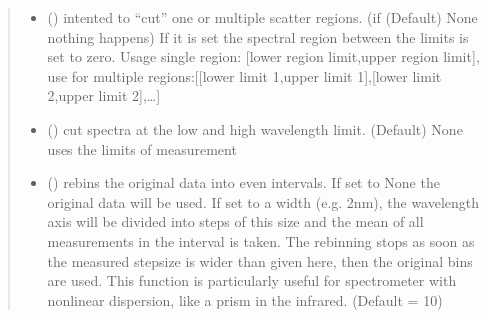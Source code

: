 \documentclass[letterpaper,10pt,english]{sphinxmanual}
\begin{document}
\begin{fulllineitems}
\begin{quote}
\begin{description}
\begin{itemize}
\item {} 
 (\sphinxstyleliteralemphasis{\sphinxupquote{ (}}\sphinxstyleliteralemphasis{\sphinxupquote{, }}\sphinxstyleliteralemphasis{\sphinxupquote{)}}\sphinxstyleliteralemphasis{\sphinxupquote{, }}) \textendash{} intented to “cut” one or multiple scatter regions. (if (Default) None nothing
happens) If it is set the spectral region between the limits is set to zero.
Usage single region: {[}lower region limit,upper region limit{]},
use for multiple regions:{[}{[}lower limit 1,upper limit 1{]},{[}lower limit 2,upper limit 2{]},…{]}

\item {} 
 (\sphinxstyleliteralemphasis{\sphinxupquote{ (}}\sphinxstyleliteralemphasis{\sphinxupquote{)}}\sphinxstyleliteralemphasis{\sphinxupquote{, }}) \textendash{} cut spectra at the low and high wavelength limit. (Default) None
uses the limits of measurement

\item {} 
 (\sphinxstyleliteralemphasis{\sphinxupquote{, }}) \textendash{} rebins the original data into even intervals. If set to None the original data will be used.
If set to a width (e.g. 2nm), the wavelength axis will be divided into steps of this size
and the mean of all measurements in the interval is taken. The re\sphinxhyphen{}binning stops as soon as
the measured stepsize is wider than given here, then the original bins are used.
This function is particularly useful for spectrometer with non\sphinxhyphen{}linear dispersion,
like a prism in the infrared. (Default = 10)


\end{itemize}
\end{description}
\end{quote}
\end{fulllineitems}
\end{document}
